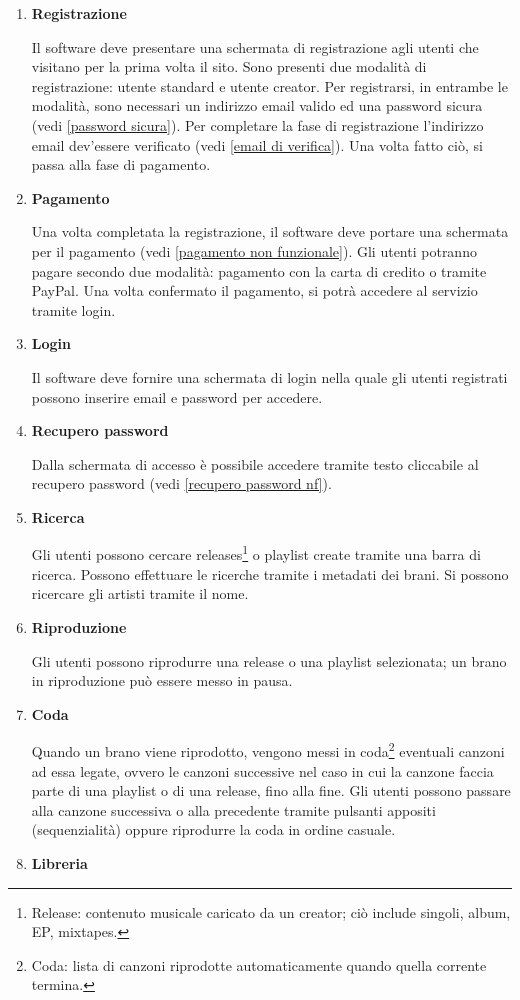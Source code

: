 \documentclass[a4paper,12pt]{article}
\begin{document}
\begin{enumerate}[label=\textbf{RF\arabic*}\;, ref=\textbf{RF\arabic*}]
    \item \label{registrazione} \textbf{Registrazione}
    
    Il software deve presentare una schermata di registrazione agli utenti che visitano per la prima volta il sito. Sono presenti due modalità di registrazione: utente standard e utente creator. Per registrarsi, in entrambe le modalità, sono necessari un indirizzo email valido ed una password sicura (vedi \ref{password sicura}). Per completare la fase di registrazione l'indirizzo email dev'essere verificato (vedi \ref{email di verifica}). Una volta fatto ciò, si passa alla fase di pagamento.
    \item \label{pagamento} \textbf{Pagamento}

    Una volta completata la registrazione, il software deve portare una schermata per il pagamento (vedi \ref{pagamento non funzionale}). Gli utenti potranno pagare secondo due modalità: pagamento con la carta di credito o tramite PayPal. Una volta confermato il pagamento, si potrà accedere al servizio tramite login.
    \item \label{login} \textbf{Login}
    
    Il software deve fornire una schermata di login nella quale gli utenti registrati possono inserire email e password per accedere.
    \item \label{recupero password} \textbf{Recupero password}

    Dalla schermata di accesso è possibile accedere tramite testo cliccabile al recupero password (vedi \ref{recupero password nf}).
    \item \label{ricerca} \textbf{Ricerca}
    
    Gli utenti possono cercare releases\footnote{Release: contenuto musicale caricato da un creator; ciò include singoli, album, EP, mixtapes.} o playlist create tramite una barra di ricerca. Possono effettuare le ricerche tramite i metadati dei brani. Si possono ricercare gli artisti tramite il nome.
    \item \label{riproduzione} \textbf{Riproduzione}
    
    Gli utenti possono riprodurre una release o una playlist selezionata; un brano in riproduzione può essere messo in pausa.
    \item \label{coda} \textbf{Coda}

    Quando un brano viene riprodotto, vengono messi in coda\footnote{Coda: lista di canzoni riprodotte automaticamente quando quella corrente termina.} eventuali canzoni ad essa legate, ovvero le canzoni successive nel caso in cui la canzone faccia parte di una playlist o di una release, fino alla fine. Gli utenti possono passare alla canzone successiva o alla precedente tramite pulsanti appositi (sequenzialità) oppure riprodurre la coda in ordine casuale.
    \item \label{libreria} \textbf{Libreria}


\end{enumerate}
\end{document}
